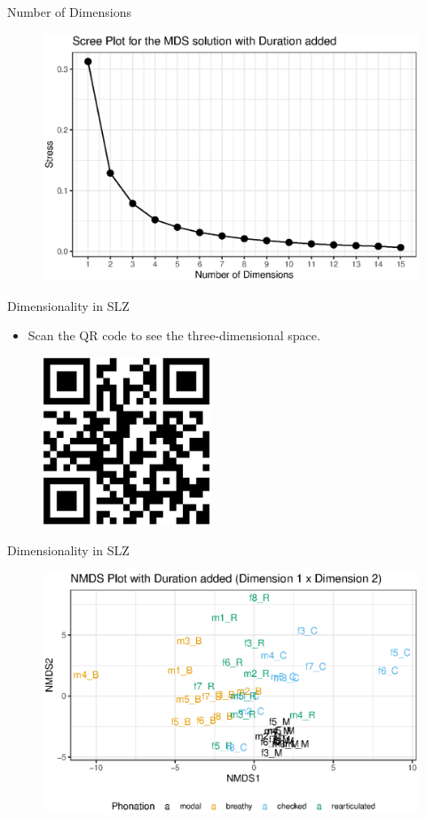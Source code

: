 \documentclass{beamer}
\begin{document}
\begin{frame}{Number of Dimensions}
  \begin{figure}[h!]
    \centering
    \includegraphics[width = 0.8\linewidth]{images/MDS/stress_plot_dur.eps}
\end{figure}
\end{frame}

\begin{frame}{Dimensionality in SLZ}
  \begin{itemize}
    \item Scan the QR code to see the three-dimensional space.
  \end{itemize}
  \begin{figure}[h!]
    \centering
    \includegraphics[width=5cm, scale=0.5]{qrcode_3d_plot.eps}
  \end{figure}
\end{frame}

\begin{frame}{Dimensionality in SLZ}
  \begin{figure}
    \centering
    \includegraphics[width = 0.8\linewidth]{images/MDS/nmds12_dur.eps}
  \end{figure}
\end{frame}
\end{document}
